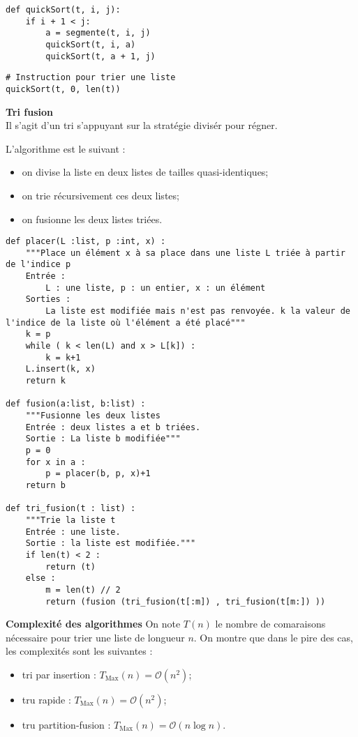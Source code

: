 \begin{lstlisting}
def quickSort(t, i, j):
    if i + 1 < j:
        a = segmente(t, i, j)
        quickSort(t, i, a)
        quickSort(t, a + 1, j)
\end{lstlisting}

\begin{lstlisting}
# Instruction pour trier une liste
quickSort(t, 0, len(t))
\end{lstlisting}
\begin{defi}\textbf{Tri fusion} \\
Il s'agit d'un tri s'appuyant sur la stratégie divisér pour régner. 

L'algorithme est le suivant : 
\begin{itemize}
\item on divise la liste en deux listes de tailles quasi-identiques;
\item on trie récursivement ces deux listes;
\item on fusionne les deux listes triées.
\end{itemize}
\end{defi}

\begin{lstlisting}
def placer(L :list, p :int, x) :
    """Place un élément x à sa place dans une liste L triée à partir de l'indice p
    Entrée :
        L : une liste, p : un entier, x : un élément
    Sorties :
        La liste est modifiée mais n'est pas renvoyée. k la valeur de l'indice de la liste où l'élément a été placé"""
    k = p
    while ( k < len(L) and x > L[k]) :
        k = k+1
    L.insert(k, x)
    return k
    
def fusion(a:list, b:list) :
    """Fusionne les deux listes
    Entrée : deux listes a et b triées.
    Sortie : La liste b modifiée"""
    p = 0
    for x in a :
        p = placer(b, p, x)+1
    return b

def tri_fusion(t : list) :
    """Trie la liste t
    Entrée : une liste.
    Sortie : la liste est modifiée."""
    if len(t) < 2 :
        return (t)
    else :
        m = len(t) // 2
        return (fusion (tri_fusion(t[:m]) , tri_fusion(t[m:]) ))
\end{lstlisting}

\begin{proposition}\textbf{Complexité des algorithmes}
On note $T(n)$ le nombre de comaraisons nécessaire pour trier une liste de longueur $n$. 
On montre que dans le pire des cas, les complexités sont les suivantes :
\begin{itemize}
\item tri par insertion : $T_{\text{Max}}(n)=\mathcal{O}\left(n^2\right)$;
\item tru rapide : $T_{\text{Max}}(n)=\mathcal{O}\left(n^2\right)$;
\item tru partition-fusion : $T_{\text{Max}}(n)=\mathcal{O}\left(n\log n\right)$.
\end{itemize}



\end{proposition}




